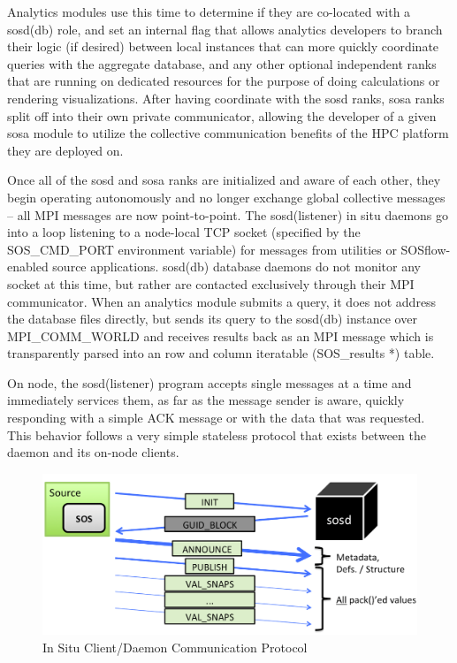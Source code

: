 Analytics modules use this time to determine if they are co-located
with a sosd(db) role, and set an internal flag that allows analytics
developers to branch their logic (if desired) between local instances that
can more quickly coordinate queries with the aggregate database, and any 
other optional independent ranks that are running on dedicated resources
for the purpose of doing calculations or rendering visualizations. After
having coordinate with the sosd ranks, sosa ranks split off into their own
private communicator, allowing the developer of a given sosa module to
utilize the collective communication benefits of the HPC platform they
are deployed on.

Once all of the sosd and sosa ranks are initialized and aware of each
other, they begin operating autonomously and no longer exchange global
collective messages -- all MPI messages are now point-to-point. The
sosd(listener) in situ daemons go into a loop listening to a
node-local TCP socket (specified by the SOS\_CMD\_PORT environment
variable) for messages from utilities or SOSflow-enabled source
applications.  sosd(db) database daemons do not monitor any socket at
this time, but rather are contacted exclusively through their MPI
communicator. When an analytics module submits a query, it does not
address the database files directly, but sends its query to the
sosd(db) instance over MPI\_COMM\_WORLD and receives results back as
an MPI message which is transparently parsed into an row and column
iteratable (SOS\_results *) table.

On node, the sosd(listener) program accepts single messages at a time
and immediately services them, as far as the message sender is aware,
quickly responding with a simple ACK message or with the data that was
requested.  This behavior follows a very simple stateless protocol
that exists between the daemon and its on-node clients.

\begin{figure}[!t]
\centering
\includegraphics[width=5in]{images/sosd_protocol.png}
\caption{In Situ Client/Daemon Communication Protocol}
\label{fig_sim}
\end{figure}


